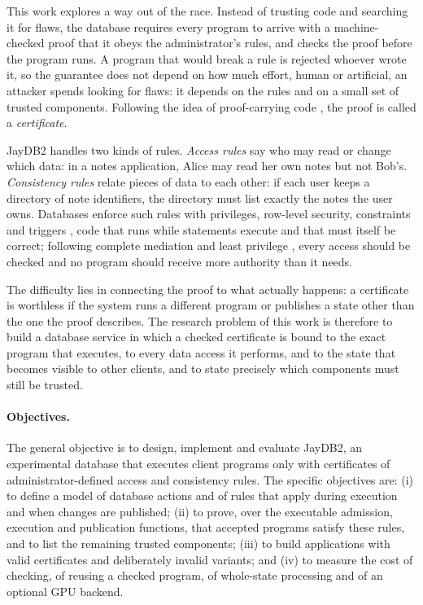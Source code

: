 \documentclass[12pt]{article}
\begin{document}
This work explores a way out of the race. Instead of trusting code and searching
it for flaws, the database requires every program to arrive with a
machine-checked proof that it obeys the administrator's rules, and checks the
proof before the program runs. A program that would break a rule is rejected
whoever wrote it, so the guarantee does not depend on how much effort, human or
artificial, an attacker spends looking for flaws: it depends on the rules and on
a small set of trusted components. Following the idea of proof-carrying code
\cite{necula1997}, the proof is called a \emph{certificate}.

JayDB2 handles two kinds of rules. \emph{Access rules} say who may read or
change which data: in a notes application, Alice may read her own notes but not
Bob's. \emph{Consistency rules} relate pieces of data to each other: if each
user keeps a directory of note identifiers, the directory must list exactly the
notes the user owns. Databases enforce such rules with privileges, row-level
security, constraints and triggers \cite{bertino2005}, code that runs while
statements execute and that must itself be correct; following complete
mediation and least privilege \cite{saltzer1975}, every access should be
checked and no program should receive more authority than it needs.

The difficulty lies in connecting the proof to what actually happens: a
certificate is worthless if the system runs a different program or publishes a
state other than the one the proof describes. The research problem of this work is therefore to
build a database service in which a checked certificate is bound to the exact
program that executes, to every data access it performs, and to the state that
becomes visible to other clients, and to state precisely which components must
still be trusted.

\paragraph{Objectives.}
The general objective is to design, implement and evaluate JayDB2, an
experimental database that executes client programs only with certificates of
administrator-defined access and consistency rules. The specific objectives are:
(i) to define a model of database actions and of rules that apply during
execution and when changes are published; (ii) to prove, over the executable
admission, execution and publication functions, that accepted programs satisfy
these rules, and to list the remaining trusted components; (iii) to build
applications with valid certificates and deliberately invalid variants; and
(iv) to measure the cost of checking, of reusing a checked program, of
whole-state processing and of an optional GPU backend.
\end{document}
